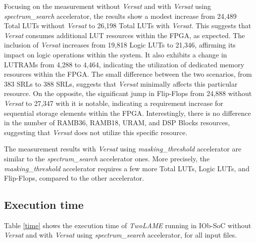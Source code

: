 Focusing on the measurement without \textit{Versat} and with \textit{Versat} using \textit{spectrum\_search} accelerator, the results show a modest increase from 24,489 Total LUTs without \textit{Versat} to 26,198 Total LUTs with \textit{Versat}. This suggests that \textit{Versat} consumes additional LUT resources within the FPGA, as expected.
The inclusion of \textit{Versat} increases from 19,818 Logic LUTs to 21,346, affirming its impact on logic operations within the system. It also exhibits a change in LUTRAMs from 4,288 to 4,464, indicating the utilization of dedicated memory resources within the FPGA.
The small difference between the two scenarios, from 383 SRLs to 388 SRLs, suggests that \textit{Versat} minimally affects this particular resource. On the opposite, the significant jump in Flip-Flops from 24,888 without \textit{Versat} to 27,347 with it is notable, indicating a requirement increase for sequential storage elements within the FPGA.
Interestingly, there is no difference in the number of RAMB36, RAMB18, URAM, and DSP Blocks resources, suggesting that \textit{Versat} does not utilize this specific resource.

The measurement results with \textit{Versat} using \textit{masking\_threshold} accelerator are similar to the \textit{spectrum\_search} accelerator ones. More precisely, the \textit{masking\_threshold} accelerator requires a few more Total LUTs, Logic LUTs, and Flip-Flops, compared to the other accelerator.


\subsection{Execution time}

Table \ref{time} shows the execution time of \textit{TwoLAME} running in IOb-SoC without \textit{Versat} and with \textit{Versat} using \textit{spectrum\_search} accelerator, for all input files.

\vspace{1cm}

